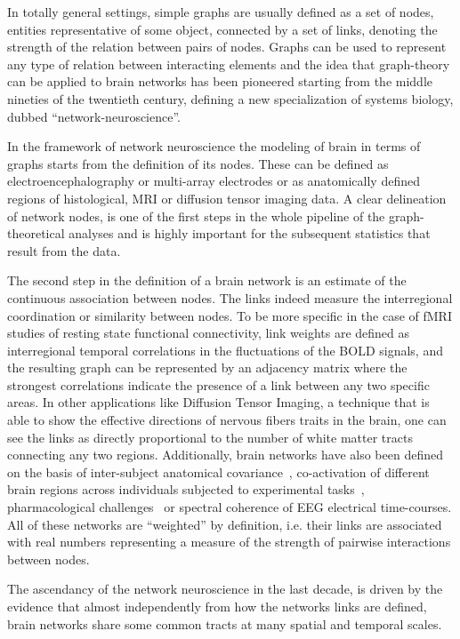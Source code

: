In totally general settings, simple graphs are usually defined as a set of nodes, entities representative of some object, connected by a set of links, denoting the strength of the relation between pairs of nodes.
Graphs can be used to represent any type of relation between interacting elements and the idea that graph-theory can be applied to brain networks has been pioneered starting from the middle nineties of the twentieth century, defining a new specialization of systems biology, dubbed ``network-neuroscience''.

In the framework of network neuroscience the modeling of brain in terms of graphs starts from the definition of its nodes. These can be defined as electroencephalography or multi-array electrodes or as anatomically defined regions of histological, MRI or diffusion tensor imaging data. A clear delineation of network nodes, is one of the first steps in the whole pipeline of the graph-theoretical analyses and is highly important for the subsequent statistics that result from the data.

The second step in the definition of a brain network is an estimate of the continuous association between nodes. The links indeed measure the interregional coordination or similarity between nodes.
To be more specific in the case of fMRI studies of resting state functional connectivity, link weights are defined as interregional temporal correlations in the fluctuations of the BOLD signals, and the resulting graph can be represented by an adjacency matrix where the strongest correlations indicate the presence of a link between any two specific areas.
In other applications like Diffusion Tensor Imaging, a technique that is able to show the effective directions of nervous fibers traits in the brain, one can see the links as directly proportional to the number of white matter tracts connecting any two regions.
Additionally, brain networks have also been defined on the basis of inter-subject anatomical covariance~\cite{Evans2013,he2007}, co-activation of different brain regions across individuals subjected to experimental tasks~\cite{crossley2013a}, pharmacological challenges~\cite{Schwarz2007,schwarz2008} or  spectral coherence of EEG electrical time-courses.
All of these networks are ``weighted'' by definition, i.e. their links are associated with real numbers representing a measure of the strength of pairwise interactions between nodes.

The ascendancy of the network neuroscience in the last decade, is driven by the evidence that almost independently from how the networks links are defined, brain networks share some common tracts at many spatial and temporal scales.

